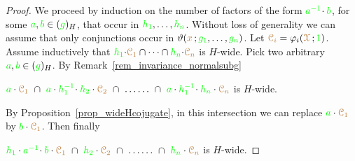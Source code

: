 \begin{proof}
  We proceed by induction on the number of factors of the form ${\color{green} a^{-1}}\!\cdot{\color{green}b}$, for some ${\color{green} a},{\color{green} b}\in({\color{green} g})_H$, that occur in ${\color{green} h_1},\dots,{\color{green} h_n}$.
  Without loss of generality we can assume that only conjunctions occur in $\vartheta({\color{brown} x}\,;{\color{green} g_1},\dots,{\color{green} g_n})$.
  Let ${\color{brown}\EuScript C_i}=\varphi_i({\color{brown}\EuScript X}\,;{\color{green} 1})$.
  Assume inductively that ${\color{green} h_1}{\cdot}{\color{brown}\EuScript C_1}\cap\dots\cap{\color{green}h_n}{\cdot}{\color{brown}\EuScript C_n}$ is $H$-wide.
  Pick two arbitrary ${\color{green} a},{\color{green} b}\in({\color{green} g})_H$.
  By Remark~\ref{rem_invariance_normalsubg} 
  
  \hspace*{7ex}${\gr a}\cdot{\mr\C_1}\ \cap\ {\gr a}\cdot{\gr h_1^{-1}}\!\cdot{\gr h_2}\cdot{\mr\C_2}\ \cap\ \dots\dots\ \cap\ {\gr a}\cdot{\gr h_1^{-1}}\!\cdot{\gr h_n}\cdot{\mr\C_n}$ is $H$-wide.
  
  By Proposition~\ref{prop_wideHcojugate}, in this intersection we can replace ${\color{green} a}\cdot{\color{brown}\EuScript C_1}$ by ${\color{green} b}\cdot{\color{brown}\EuScript C_1}$.
  Then finally 

  \hspace*{7ex}${\gr h_1}\cdot{\gr a^{-1}}\!\cdot{\gr b}\cdot{\mr\C_1}\ \cap\ {\gr h_2}\cdot{\mr\C_2}\ \cap\ \dots\dots\ \cap\ {\gr h_n}\cdot{\mr\C_n}$ is $H$-wide.
\end{proof}



